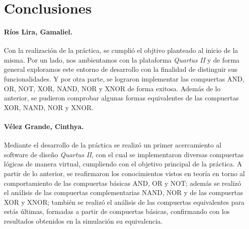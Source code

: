 \documentclass[../main.tex]{subfiles}
\begin{document}
\clearpage
\section{Conclusiones}
\paragraph{Ríos Lira, Gamaliel.} Con la realización de la práctica, se cumplió 
el objtivo planteado al inicio de la misma. Por un lado, nos ambientamos con 
la plataforma \textit{Quartus II} y de forma general exploramos este entorno 
de desarrollo con la finalidad de distinguir sus funcionalidades. Y por otra 
parte, se lograron implementar las compuertas AND, OR, NOT, XOR, NAND, NOR y 
XNOR de forma exitosa. Además de lo anterior, se pudieron comprobar algunas 
formas equivalentes de las compuertas XOR, NAND, NOR y XNOR.

\paragraph{Vélez Grande, Cinthya.} Mediante el desarrollo de la práctica se 
realizó un primer acercamiento al software de diseño \textit{Quartus II}, con 
el cual se implementaron diversas compuertas lógicas de manera virtual, 
cumpliendo con el objetivo principal de la práctica. A partir de lo anterior, 
se reafirmaron los conocimientos vistos en teoría en torno al comportamiento 
de las compuertas básicas AND, OR y NOT; además se realizó el análisis de las 
compuertas complementarias NAND, NOR y de las compuertas XOR y XNOR; también 
se realizó el análisis de las compuertas equivalentes para estás últimas, 
formadas a partir de compuertas básicas, confirmando con los resultados 
obtenidos en la simulación su equivalencia.
\end{document}
